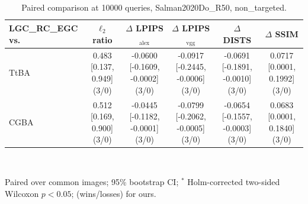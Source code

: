 \begin{table}[t]
\centering\footnotesize
\caption{Paired comparison at 10000 queries, Salman2020Do\_R50, non\_targeted.}
\begin{tabular}{lccccc}
\toprule
LGC\_RC\_EGC vs. & $\ell_2$ ratio & $\Delta$ LPIPS$_{\mathrm{alex}}$ & $\Delta$ LPIPS$_{\mathrm{vgg}}$ & $\Delta$ DISTS & $\Delta$ SSIM \\
\midrule
TtBA & 0.483 [0.137, 0.949] (3/0) & -0.0600 [-0.1609, -0.0002] (3/0) & -0.0917 [-0.2445, -0.0006] (3/0) & -0.0691 [-0.1891, -0.0010] (3/0) & 0.0717 [0.0001, 0.1992] (3/0) \\
CGBA & 0.512 [0.169, 0.900] (3/0) & -0.0445 [-0.1182, -0.0001] (3/0) & -0.0799 [-0.2062, -0.0005] (3/0) & -0.0654 [-0.1557, -0.0003] (3/0) & 0.0683 [0.0001, 0.1840] (3/0) \\
\bottomrule
\end{tabular}
\\[2pt]\parbox{\linewidth}{\scriptsize Paired over common images; 95\% bootstrap CI; $^{*}$ Holm-corrected two-sided Wilcoxon $p<0.05$; (wins/losses) for ours.}
\end{table}
